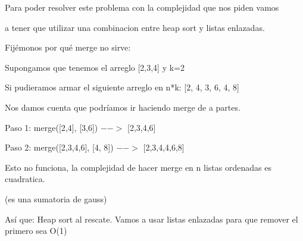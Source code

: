 \documentclass[10pt,a4paper]{article}
\begin{document}

\par Para poder resolver este problema con la complejidad que nos piden vamos
\par a tener que utilizar una combinacion entre heap sort y listas enlazadas.
\par Fijémonos por qué merge no sirve:
\par Supongamos que tenemos el arreglo [2,3,4] y k=2
\par Si pudieramos armar el siguiente arreglo en n*k: [2, 4, 3, 6, 4, 8]
\par Nos damos cuenta que podríamos ir haciendo merge de a partes.
\par Paso 1: merge([2,4], [3,6]) \ensuremath{-->} [2,3,4,6]
\par Paso 2: merge([2,3,4,6], [4, 8]) \ensuremath{-->} [2,3,4,4,6,8]
\par Esto no funciona, la complejidad de hacer merge en n listas ordenadas es cuadratica.
\par (es una sumatoria de gauss)
\par Así que: Heap sort al rescate. Vamos a usar listas enlazadas para que remover el primero sea O(1)
\end{document}
